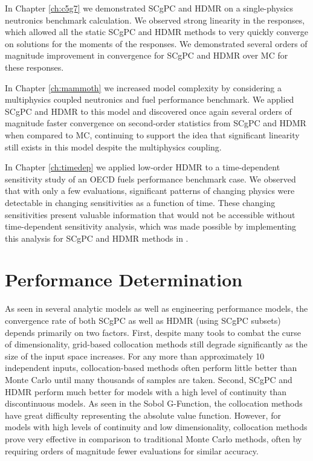 In Chapter \ref{ch:c5g7} we demonstrated SCgPC and HDMR on a single-physics neutronics benchmark calculation.
We observed strong linearity in the responses, which allowed all the static SCgPC and HDMR methods to very
quickly converge on solutions for the moments of the responses.  We demonstrated several orders of magnitude
improvement in convergence for SCgPC and HDMR over MC for these responses.

In Chapter \ref{ch:mammoth} we increased model complexity by considering a multiphysics coupled neutronics and
fuel performance benchmark.  We applied SCgPC and HDMR to this model and discovered once again several orders
of magnitude faster convergence on second-order statistics from SCgPC and HDMR when compared to MC, continuing
to support the idea that significant linearity still exists in this model despite the multiphysics coupling.

In Chapter \ref{ch:timedep} we applied low-order HDMR to a time-dependent sensitivity study of an OECD fuels
performance benchmark case.  We observed that with only a few evaluations, significant patterns of changing
physics were detectable in changing sensitivities as a function of time.  These changing sensitivities present
valuable information that would not be accessible without time-dependent sensitivity analysis, which was made
possible by implementing this analysis for SCgPC and HDMR methods in \raven{}.

\section{Performance Determination}
As seen in several analytic models as well as engineering performance models, the convergence rate of both 
SCgPC as well as HDMR (using SCgPC subsets) depends primarily
on two factors. 
First, despite many tools to combat the curse of dimensionality, grid-based collocation methods still degrade
significantly as the size of the input space increases.  For any more than approximately 10 independent inputs, collocation-based
methods often perform little better than Monte Carlo until many thousands of 
samples are taken.  Second, SCgPC and HDMR perform much
better for models with a high level of continuity than discontinuous models.  As seen in the Sobol G-Function, the collocation
methods have great difficulty representing the absolute value function.  
However, for models with high levels of continuity and low dimensionality, collocation methods prove very effective in comparison
to traditional Monte Carlo methods, often by requiring orders of magnitude fewer evaluations for similar
accuracy.

